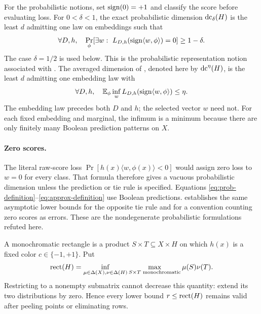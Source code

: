 For the probabilistic notions, set $\operatorname{sign}(0)=+1$ and classify the score before evaluating loss. For $0<\delta<1$, the exact probabilistic dimension $\operatorname{dc}_\delta(H)$ is the least $d$ admitting one law on embeddings such that
\begin{equation}\label{eq:prob-definition}
 \forall D,h,\quad
 \Pr_\phi\!\left[\exists w:\ L_{D,h}(\operatorname{sign}\langle w,\phi\rangle)=0\right]\ge1-\delta.
\end{equation}
The case $\delta=1/2$ is used below. This is the probabilistic representation notion associated with \citet{CMW25}. The averaged dimension of \citet{KMS20}, denoted here by $\operatorname{dc}^\eta(H)$, is the least $d$ admitting one embedding law with
\begin{equation}\label{eq:approx-definition}
 \forall D,h,\quad
 \mathbb E_\phi\inf_w L_{D,h}(\operatorname{sign}\langle w,\phi\rangle)\le\eta.
\end{equation}
The embedding law precedes both $D$ and $h$; the selected vector $w$ need not. For each fixed embedding and marginal, the infimum is a minimum because there are only finitely many Boolean prediction patterns on $X$.

\paragraph{Zero scores.}
The literal raw-score loss $\Pr[h(x)\langle w,\phi(x)\rangle<0]$ would assign zero loss to $w=0$ for every class. That formula therefore gives a vacuous probabilistic dimension unless the prediction or tie rule is specified. Equations \eqref{eq:prob-definition}--\eqref{eq:approx-definition} use Boolean predictions.  establishes the same asymptotic lower bounds for the opposite tie rule and for a convention counting zero scores as errors. These are the nondegenerate probabilistic formulations refuted here.

A monochromatic rectangle is a product $S\times T\subseteq X\times H$ on which $h(x)$ is a fixed color $c\in\{-1,+1\}$. Put
\begin{equation}\label{eq:rect-definition}
 \operatorname{rect}(H)=\inf_{\mu\in\Delta(X),\nu\in\Delta(H)}
 \max_{S\times T\text{ monochromatic}}\mu(S)\nu(T).
\end{equation}
Restricting to a nonempty submatrix cannot decrease this quantity: extend its two distributions by zero. Hence every lower bound $r\le\operatorname{rect}(H)$ remains valid after peeling points or eliminating rows.

